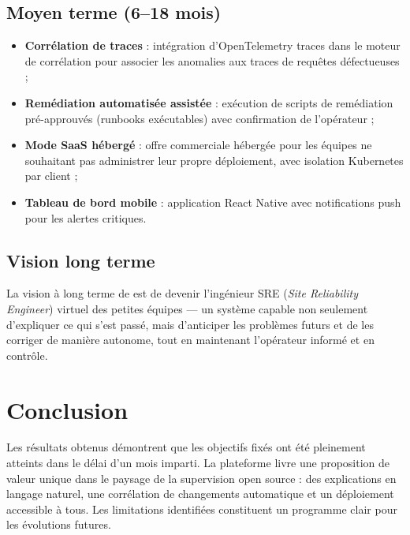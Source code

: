 \subsection{Moyen terme (6--18 mois)}

\begin{itemize}
  \item \textbf{Corrélation de traces} : intégration d'OpenTelemetry traces
    dans le moteur de corrélation pour associer les anomalies aux traces
    de requêtes défectueuses ;
  \item \textbf{Remédiation automatisée assistée} : exécution de scripts de
    remédiation pré-approuvés (runbooks exécutables) avec confirmation de
    l'opérateur ;
  \item \textbf{Mode SaaS hébergé} : offre commerciale hébergée pour les
    équipes ne souhaitant pas administrer leur propre déploiement, avec
    isolation Kubernetes par client ;
  \item \textbf{Tableau de bord mobile} : application React Native avec
    notifications push pour les alertes critiques.
\end{itemize}

\subsection{Vision long terme}

La vision à long terme de \caimp{} est de devenir l'ingénieur SRE
(\textit{Site Reliability Engineer}) virtuel des petites équipes --- un
système capable non seulement d'expliquer ce qui s'est passé, mais
d'anticiper les problèmes futurs et de les corriger de manière autonome,
tout en maintenant l'opérateur informé et en contrôle.

\section*{Conclusion}

Les résultats obtenus démontrent que les objectifs fixés ont été pleinement
atteints dans le délai d'un mois imparti. La plateforme \caimp{} livre une
proposition de valeur unique dans le paysage de la supervision open source :
des explications en langage naturel, une corrélation de changements automatique
et un déploiement accessible à tous. Les limitations identifiées constituent
un programme clair pour les évolutions futures.
